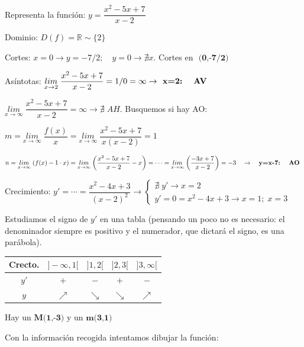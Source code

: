 \begin{ejre} Representa la función: $y=\dfrac {x^2-5x+7}{x-2}$
	
\end{ejre}

\begin{proofw}\renewcommand{\qedsymbol}{$\diamond$}	

Dominio: $D(f)=\mathbb R \sim \{2\}$

Cortes: $x=0 \to y=-7/2; \quad y=0 \to \nexists x$. Cortes en $\textbf { (0,-7/2) } $

Asíntotas: $\underset{x\to 2}{lim}\;{\dfrac {x^2-5x+7}{x-2}}=1/0=\infty \to \textbf{ x=2: \; AV   }  $

$\underset {x\to \infty}{lim}\;{\dfrac {x^2-5x+7}{x-2}}=\infty \to {\nexists \; AH} $. Busquemos si hay AO:

$m=\underset {x\to \infty}{lim}\;{\dfrac {f(x)}{x}}=\underset {x\to \infty}{lim}\;{ \dfrac {x^2-5x+7}{x(x-2)} }=1$

$n=\underset {x\to \infty}{lim}\; {(f(x)- 1\cdot x)}=
\underset {x\to \infty}{lim}\;{\left( \dfrac {x^2-5x+7}{x-2}-x \right)}=\cdots=\underset {x\to \infty}{lim}\;{\left( \dfrac {-3x+7}{x-2} \right)}=-3 \quad \to \quad \textbf{y=x-7: \; AO }$

Crecimiento: $y'=\cdots= \dfrac {x^2-4x+3}{(x-2)^2} \to \begin{cases}
 \nexists \; y' \to x=2 \\
 y'=0=x^2-4x+3 \to x=1; \; x=3	
 \end{cases}$
 
 Estudiamos el signo de $y'$ en una tabla (pensando un poco no es necesario: el denominador siempre es positivo y el numerador, que dictará el signo, es una parábola).
 
 	\begin{table}[H]
 	\centering
	\begin{tabular}{|c|c|c|c|c|}
	\hline
 	Crecto. & $]-\infty,1[$ & $]1,2[$ & $]2,3[$ & $]3,\infty[$ \\ \hline
 $y'$	& $+$ & $-$ & $+$ & $-$ \\ \hline
  $y$	& $\nearrow$ &$\searrow$  & $\searrow$ & $\nearrow$ \\ \hline
	\end{tabular}
	\end{table}
	
	Hay un $\textbf{M(1,-3)} $ y un $\textbf{m(3,1)}$
	
	Con la información recogida intentamos dibujar la función:
	

\end{proofw}
